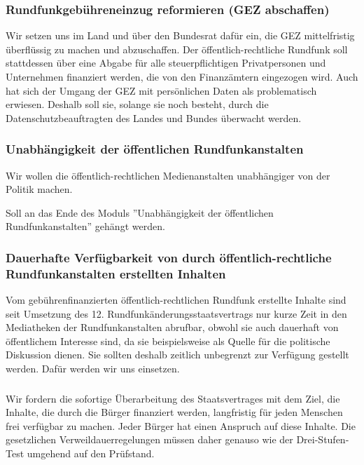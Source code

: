 \subsubsection{Rundfunkgebühreneinzug reformieren (GEZ abschaffen)}
\abstimmung
Wir setzen uns im Land und über den Bundesrat dafür ein, die GEZ mittelfristig überflüssig zu machen und abzuschaffen. Der öffentlich-rechtliche Rundfunk soll stattdessen über eine Abgabe für alle steuerpflichtigen Privatpersonen und Unternehmen finanziert werden, die von den Finanzämtern eingezogen wird. Auch hat sich der Umgang der GEZ mit persönlichen Daten als problematisch erwiesen. Deshalb soll sie, solange sie noch besteht, durch die Datenschutzbeauftragten des Landes und Bundes überwacht werden.
 
\newpage
{}

\subsubsection{Unabhängigkeit der öffentlichen Rundfunkanstalten}
\abstimmung
Wir wollen die öffentlich-rechtlichen Medienanstalten unabhängiger von der Politik machen.

Soll an das Ende des Moduls ''Unabhängigkeit der öffentlichen Rundfunkanstalten'' gehängt werden.

 
\label{wp:kultur:rundfunk4}

\subsubsection{Dauerhafte Verfügbarkeit von durch öffentlich-rechtliche Rundfunkanstalten erstellten Inhalten}
\abstimmung
Vom gebührenfinanzierten öffentlich-rechtlichen Rundfunk erstellte Inhalte sind seit Umsetzung des 12. Rundfunkänderungsstaatsvertrags nur kurze Zeit in den Mediatheken der Rundfunkanstalten abrufbar, obwohl sie auch dauerhaft von öffentlichem Interesse sind, da sie beispielsweise als Quelle für die politische Diskussion dienen. Sie sollten deshalb zeitlich unbegrenzt zur Verfügung gestellt werden. Dafür werden wir uns einsetzen.
 

\subsubsection{ }
\abstimmung
Wir fordern die sofortige Überarbeitung des Staatsvertrages mit dem Ziel, die Inhalte, die durch die Bürger finanziert werden, langfristig für jeden Menschen frei verfügbar zu machen. Jeder Bürger hat einen Anspruch auf diese Inhalte. Die gesetzlichen Verweildauerregelungen müssen daher genauso wie der Drei-Stufen-Test umgehend auf den Prüfstand.
 
